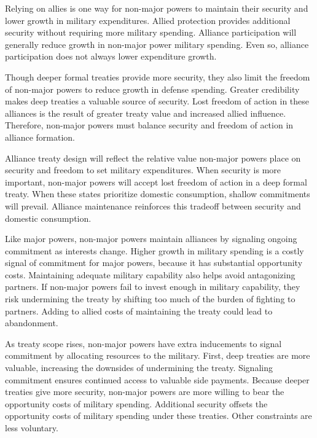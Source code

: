 \documentclass[12pt]{article}
\begin{document}
Relying on allies is one way for non-major powers to maintain their security and lower growth in military expenditures.  
Allied protection provides additional security without requiring more military spending. 
Alliance participation will generally reduce growth in non-major power military spending. 
Even so, alliance participation does not always lower expenditure growth.
 


Though deeper formal treaties provide more security, they also limit the freedom of non-major powers to reduce growth in defense spending.
Greater credibility makes deep treaties a valuable source of security. 
Lost freedom of action in these alliances is the result of greater treaty value and increased allied influence. 
Therefore, non-major powers must balance security and freedom of action in alliance formation. 


Alliance treaty design will reflect the relative value non-major powers place on security and freedom to set military expenditures. 
When security is more important, non-major powers will accept lost freedom of action in a deep formal treaty.
When these states prioritize domestic consumption, shallow commitments will prevail. 
Alliance maintenance reinforces this tradeoff between security and domestic consumption. 


Like major powers, non-major powers maintain alliances by signaling ongoing commitment as interests change. 
Higher growth in military spending is a costly signal of commitment for major powers, because it has substantial opportunity costs. 
Maintaining adequate military capability also helps avoid antagonizing partners. 
If non-major powers fail to invest enough in military capability, they risk undermining the treaty by shifting too much of the burden of fighting to partners. 
Adding to allied costs of maintaining the treaty could lead to abandonment. 


As treaty scope rises, non-major powers have extra inducements to signal commitment by allocating resources to the military.
First, deep treaties are more valuable, increasing the downsides of undermining the treaty. 
Signaling commitment ensures continued access to valuable side payments.   
Because deeper treaties give more security, non-major powers are more willing to bear the opportunity costs of military spending. 
Additional security offsets the opportunity costs of military spending under these treaties.
Other constraints are less voluntary.   
\end{document}
